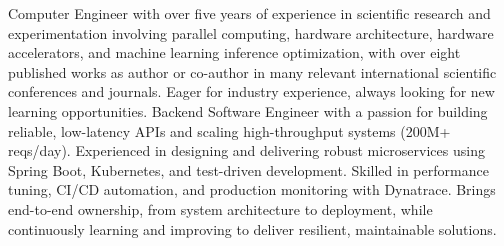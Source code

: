 

\begin{cvparagraph}

\ifhw
Computer Engineer with over five years of experience in scientific research and experimentation involving parallel computing, hardware architecture, hardware accelerators, and machine learning inference optimization, with over eight published works as author or co-author in many relevant international scientific conferences and journals. Eager for industry experience, always looking for new learning opportunities.
\else
Backend Software Engineer with a passion for building reliable, low-latency APIs and scaling high-throughput systems (200M+ reqs/day). Experienced in designing and delivering robust microservices using Spring Boot, Kubernetes, and test-driven development. Skilled in performance tuning, CI/CD automation, and production monitoring with Dynatrace. Brings end-to-end ownership, from system architecture to deployment, while continuously learning and improving to deliver resilient, maintainable solutions.
\fi

\end{cvparagraph}